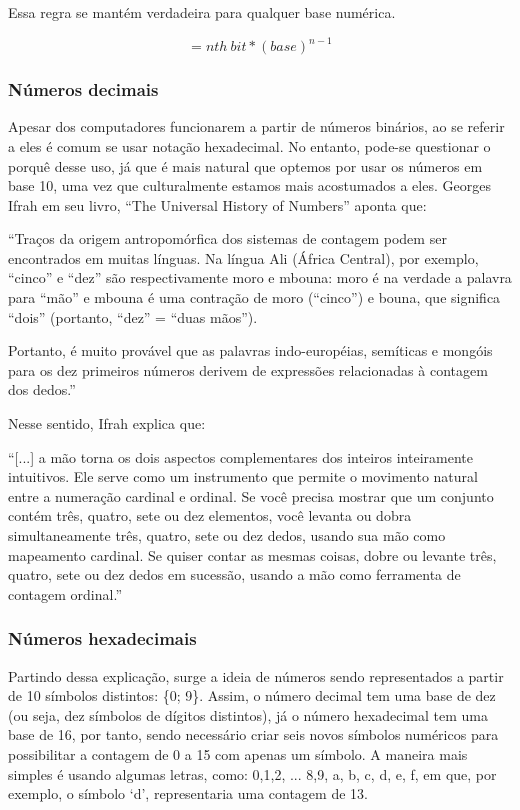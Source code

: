 Essa regra se mantém verdadeira para qualquer base numérica.

\[= nth\: bit * (base)^{n-1}\]

\subsubsection{Números decimais}

Apesar dos computadores funcionarem a partir de números binários, ao se referir a eles é comum se usar notação hexadecimal. No entanto, pode-se questionar o porquê desse uso, já que é mais natural que optemos por usar os números em base 10, uma vez que culturalmente estamos mais acostumados a eles. Georges Ifrah em seu livro, ``The Universal History of Numbers'' \cite{14} aponta que:

``Traços da origem antropomórfica dos sistemas de contagem podem ser encontrados em muitas línguas. Na língua Ali (África Central), por exemplo, ``cinco'' e ``dez'' são respectivamente moro e mbouna: moro é na verdade a palavra para ``mão'' e mbouna é uma contração de moro (``cinco'') e bouna, que significa ``dois'' (portanto, ``dez'' = ``duas mãos'').

Portanto, é muito provável que as palavras indo-européias, semíticas e mongóis para os dez primeiros números derivem de expressões relacionadas à contagem dos dedos.''

Nesse sentido, Ifrah explica que:

``[...] a mão torna os dois aspectos complementares dos inteiros inteiramente intuitivos. Ele serve como um instrumento que permite o movimento natural entre a numeração cardinal e ordinal. Se você precisa mostrar que um conjunto contém três, quatro, sete ou dez elementos, você levanta ou dobra simultaneamente três, quatro, sete ou dez dedos, usando sua mão como mapeamento cardinal. Se quiser contar as mesmas coisas, dobre ou levante três, quatro, sete ou dez dedos em sucessão, usando a mão como ferramenta de contagem ordinal.''

\subsubsection{Números hexadecimais}

Partindo dessa explicação, surge a ideia de números sendo representados a partir de 10 símbolos distintos: \{0; 9\}. Assim, o número decimal tem uma base de dez (ou seja, dez símbolos de dígitos distintos), já o número hexadecimal tem uma base de 16, por tanto, sendo necessário criar seis novos símbolos numéricos para possibilitar a contagem de 0 a 15 com apenas um símbolo. A maneira mais simples é usando algumas letras, como: 0,1,2, ... 8,9, a, b, c, d, e, f, em que, por exemplo, o símbolo `d', representaria uma contagem de 13.

